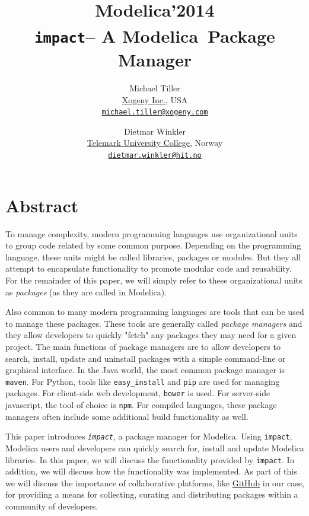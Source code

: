 \documentclass[11pt,a4paper,twocolumn]{article}
\newcommand{\myr}{\textsuperscript{\textregistered}}
\newcommand{\impact}{\texttt{impact}} %
\newcommand{\code}[1]{\texttt{#1}} %
\begin{document}
\title{\textbf{{\small Modelica'2014}\\
    \impact -- A Modelica\myr\ Package Manager}}

\author{Michael Tiller\\\href{http://xogeny.com}{Xogeny Inc.}, USA\\\href{mailto:michael.tiller@xogeny.com}{\nolinkurl{michael.tiller@xogeny.com}} %
        \and Dietmar Winkler\\\href{http://www.hit.no}{Telemark University College}, Norway\\\href{mailto:dietmar.winkler@hit.no}{\nolinkurl{dietmar.winkler@hit.no}}}
\date{} %
\maketitle\thispagestyle{empty} %

\section*{Abstract}

To manage complexity, modern programming languages use organizational
units to group code related by some common purpose.  Depending on the
programming language, these units might be called libraries, packages
or modules.  But they all attempt to encapsulate functionality to
promote modular code and reusability.  For the remainder of this
paper, we will simply refer to these organizational units as
\emph{packages} (as they are called in Modelica).

Also common to many modern programming languages are tools that can be
used to manage these packages.  These tools are generally called
\emph{package managers} and they allow developers to quickly "fetch" any
packages they may need for a given project.  The main functions of
package managers are to allow developers to search, install, update
and uninstall packages with a simple command-line or graphical
interface.  In the Java world, the most common package manager is
\code{maven}.  For Python, tools like \code{easy\_install} and \code{pip} are
used for managing packages.  For client-side web development,
\code{bower} is used.  For server-side javascript, the tool of choice is
\code{npm}.  For compiled languages, these package managers often
include some additional build functionality as well.

This paper introduces \emph{\impact}, a package manager for Modelica.
  Using \impact, Modelica users and developers can quickly search
  for, install and update Modelica libraries.  In this paper, we will
  discuss the functionality provided by \impact.  In addition, we
  will discuss how the functionality was implemented.  As part of this
  we will discuss the importance of collaborative platforms, like
  \href{https://github.com}{GitHub} in our case, for providing a means for collecting,
  curating and distributing packages within a community of developers.
\end{document}
